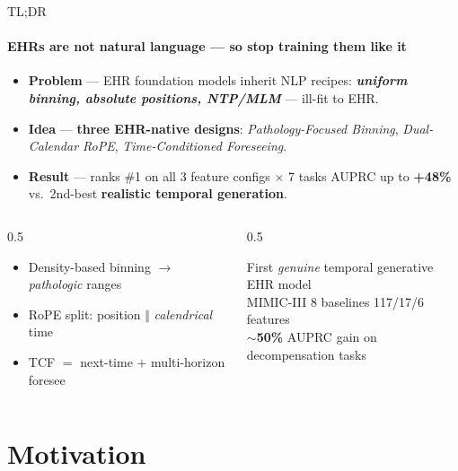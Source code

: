 \documentclass[10pt, aspectratio=169, t]{beamer}   %
\newcommand{\good}[1]{{\color{posblue}\bfseries #1}}  %
\newcommand{\warn}[1]{{\color{negmag}\bfseries #1}}   %
\newcommand{\blue}{\color{posblue}\bfseries}  %
\newcommand{\hl}{\color{posblue}\bfseries}    %
\begin{document}
\begin{frame}{TL;DR}
  \framesubtitle{EHRs are not natural language --- so stop training them like it}
  \vfill
  \begin{itemize}\setlength{\itemsep}{9pt}
    \item \textbf{Problem} --- EHR foundation models inherit NLP recipes: \warn{\emph{uniform binning, absolute positions, NTP/MLM}} --- ill-fit to EHR.
    \item \textbf{Idea} --- \good{three EHR-native designs}: \emph{Pathology-Focused Binning}, \emph{Dual-Calendar RoPE}, \emph{Time-Conditioned Foreseeing}.
    \item \textbf{Result} --- ranks \#1 on all 3 feature configs $\times$ 7 tasks \textperiodcentered{} AUPRC up to {\blue +48\%} vs.\ 2nd-best \textperiodcentered{} \good{realistic temporal generation}.
  \end{itemize}
  \vfill
  \begin{columns}[t]
    \begin{column}{0.5\textwidth}
      \begin{tcolorbox}[title={Contributions}]
        \begin{itemize}\setlength{\itemsep}{3pt}
          \item Density-based binning $\to$ \emph{pathologic} ranges
          \item RoPE split: position $\Vert$ \emph{calendrical} time
          \item TCF $=$ next-time $+$ multi-horizon foresee
        \end{itemize}
      \end{tcolorbox}
    \end{column}
    \begin{column}{0.5\textwidth}
      \begin{tcolorbox}[title={Headline}]
        First \emph{genuine} temporal generative EHR model\\[3pt]
        MIMIC-III \textperiodcentered{} 8 baselines \textperiodcentered{} 117/17/6 features\\[3pt]
        {\hl $\sim$50\%} AUPRC gain on decompensation tasks
      \end{tcolorbox}
    \end{column}
  \end{columns}
  \vfill
\end{frame}

\section{Motivation}
\end{document}
